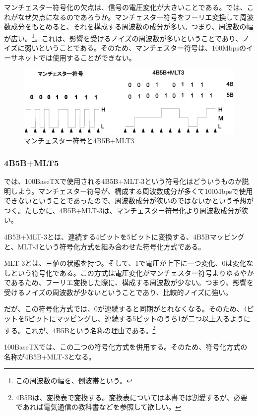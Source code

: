 マンチェスター符号化の欠点は、信号の電圧変化が大きいことである。では、これがなぜ欠点になるのであろうか。マンチェスター符号をフーリエ変換して周波数成分をもとめると、それを構成する周波数の成分が多い。つまり、周波数の幅が広い。\footnote{この周波数の幅を、側波帯という。}。これは、影響を受けるノイズの周波数が多いということであり、ノイズに弱いということである。そのため、マンチェスター符号は、100Mbpsのイーサネットでは使用することができない。

\begin{figure}[htbp]
	\includegraphics[width=12cm,clip]{draw/manchester.eps}
	\caption{マンチェスター符号と4B5B+MLT3}
	\label{fig:manchester}
\end{figure}

\subsubsection{4B5B+MLT5}
では、100BaseTXで使用される4B5B+MLT-3という符号化はどういうものか説明しよう。マンチェスター符号が、構成する周波数成分が多くて100Mbpsで使用できないということであったので、周波数成分が狭いのではないかという予想がつく。たしかに、4B5B+MLT-3は、マンチェスター符号化より周波数成分が狭い。

4B5B+MLT-3とは、連続する4ビットを5ビットに変換する、4B5Bマッピングと、MLT-3という符号化方式を組み合わせた符号化方式である。

MLT-3とは、三値の状態を持つ。そして、1で電圧が上下に一つ変化、0は変化なしという符号化である。この方式は電圧変化がマンチェスター符号よりゆるやかであるため、フーリエ変換した際に、構成する周波数が少ない。つまり、影響を受けるノイズの周波数が少ないということであり、比較的ノイズに強い。

だが、この符号化方式では、0が連続すると同期がとれなくなる。そのため、4ビットを5ビットにマッピングし、連続する5ビットのうち1が二つ以上入るようにする。これが、4B5Bという名称の理由である。\footnote{4B5Bは、変換表で変換する。変換表については本書では割愛するが、必要であれば電気通信の教科書などを参照して欲しい。}

100BaseTXでは、この二つの符号化方式を併用する。そのため、符号化方式の名称が4B5B+MLT-3となる。

